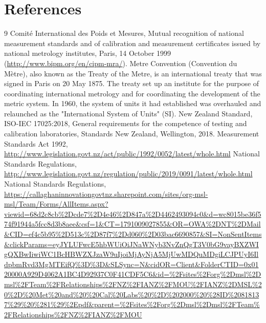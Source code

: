 \section*{References}

\begingroup
\renewcommand{\section}[2]{}%

\begin{thebibliography}{9}
 Comit\'e International des Poids et Mesures, Mutual recognition of national measurement standards and of calibration and measurement certificates issued by national metrology institutes, Paris, 14 October 1999 (\url{http://www.bipm.org/en/cipm-mra/}).
 Metre Convention (Convention du M\`etre), also known as the Treaty of the Metre, is an international treaty that was signed in Paris on 20 May 1875. The treaty set up an institute for the purpose of coordinating international metrology and for coordinating the development of the metric system. In 1960, the system of units it had established was overhauled and relaunched as the "International System of Units" (SI).
 New Zealand Standard, ISO-IEC 17025:2018, General requirements for the competence of testing and calibration laboratories, Standards New Zealand, Wellington, 2018.
 {Measurement Standards Act 1992}, \url{http://www.legislation.govt.nz/act/public/1992/0052/latest/whole.html}
 {National Standards Regulations}, \url{http://www.legislation.govt.nz/regulation/public/2019/0091/latest/whole.html}
 {National Standards Regulations}, \url{https://callaghaninnovationgovtnz.sharepoint.com/sites/org-msl-msl/Team/Forms/AllItems.aspx?viewid=68d2c8cb%2Dcde7%2D4e46%2D847a%2D4462493094c0&d=wc8015be36f574f91944a5fcc8d3b8aee&csf=1&CT=1791009027855&OR=OWA%2DNT%2DMail&CID=ef4c5b95%2D513c%2D87f7%2Dd060%2D03bac6690857&SI=NonSentItems&clickParams=eyJYLUFwcE5hbWUiOiJNaWNyb3NvZnQgT3V0bG9vayBXZWIgQXBwIiwiWC1BcHBWZXJzaW9uIjoiMjAyNjA5MjUwMDQuMDgiLCJPUyI6IldpbmRvd3MgMTEifQ%3D%3D&SLSync=N&cidOR=Client&FolderCTID=0x0120000A929D4062A1BC4D92937C0F41CDF5C6&id=%2Fsites%2Forg%2Dmsl%2Dmsl%2FTeam%2FRelationships%2FNZ%2FIANZ%2FMOU%2FIANZ%2DMSL%20%2D%20Met%20and%20%20Cal%20Labs%20%2D%202000%20%28ID%20818137%29%20%281%29%2Epdf&parent=%2Fsites%2Forg%2Dmsl%2Dmsl%2FTeam%2FRelationships%2FNZ%2FIANZ%2FMOU}

\end{thebibliography}
